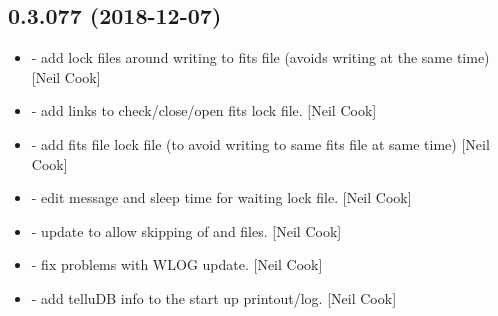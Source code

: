 \documentclass[a4paper,10pt,english]{report}
\begin{document}
\subsection{0.3.077 (2018-12-07)}
\label{\detokenize{misc/changelog:id245}}\begin{itemize}
\item {} 
 - add lock files around writing to fits file (avoids
writing at the same time) {[}Neil Cook{]}

\item {} 
 - add links to check/close/open fits lock
file. {[}Neil Cook{]}

\item {} 
 - add fits file lock file (to avoid writing to same fits
file at same time) {[}Neil Cook{]}

\item {} 
 - edit message and sleep time for waiting lock file. {[}Neil
Cook{]}

\item {} 
 - update to allow skipping of  and 
files. {[}Neil Cook{]}

\item {} 
 - fix problems with WLOG update. {[}Neil Cook{]}

\item {} 
 - add telluDB info to the start up printout/log.
{[}Neil Cook{]}

\end{itemize}
\end{document}
